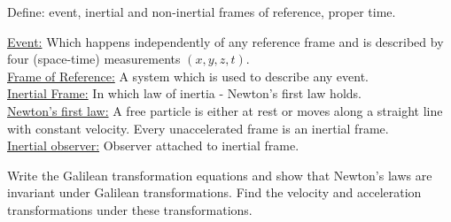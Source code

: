 \documentclass[../main-sheet.tex]{subfiles}
\begin{document}
\begin{prob}
    Define: event, inertial and non-inertial frames of reference, proper time.
\end{prob}
\begin{soln}
    \underline{Event:} Which happens independently of any reference frame and is described by four (space-time) measurements \((x,y,z,t )\).\\
\underline{Frame of Reference:} A system which is used to describe any event.\\
\underline{Inertial Frame:} In which law of inertia - Newton's first law holds.\\
\underline{Newton's first law:} A free particle is either at rest or moves along a straight line with constant velocity. Every unaccelerated frame is an inertial frame.\\
\underline{Inertial observer:} Observer attached to inertial frame.
\end{soln}
\begin{prob}
    Write the Galilean transformation equations and show that Newton's laws are invariant under Galilean transformations. Find the velocity and acceleration transformations under these transformations.
\end{prob}
\end{document}
